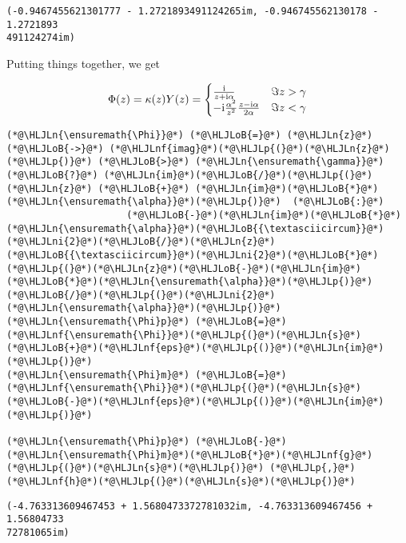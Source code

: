 \documentclass[12pt,a4paper]{article}
\newcommand{\HLJLn}[1]{#1}
\newcommand{\HLJLnf}[1]{\textcolor[RGB]{66,102,213}{#1}}
\newcommand{\HLJLni}[1]{\textcolor[RGB]{59,151,46}{#1}}
\newcommand{\HLJLoB}[1]{\textcolor[RGB]{102,102,102}{\textbf{#1}}}
\newcommand{\HLJLp}[1]{#1}
\def\I{ {\rm i} }
\begin{document}
\begin{lstlisting}
(-0.9467455621301777 - 1.2721893491124265im, -0.946745562130178 - 1.2721893
491124274im)
\end{lstlisting}


Putting things together, we get

\[
\Phi(z) = \kappa(z) Y(z) = \begin{cases} {\I \over z+\I \alpha }& \Im z > \gamma \\
                        -\I {\alpha^2 \over z^2} {z-\I \alpha \over 2 \alpha} & \Im z < \gamma
\end{cases}
\]

\begin{lstlisting}
(*@\HLJLn{\ensuremath{\Phi}}@*) (*@\HLJLoB{=}@*) (*@\HLJLn{z}@*) (*@\HLJLoB{->}@*) (*@\HLJLnf{imag}@*)(*@\HLJLp{(}@*)(*@\HLJLn{z}@*)(*@\HLJLp{)}@*) (*@\HLJLoB{>}@*) (*@\HLJLn{\ensuremath{\gamma}}@*) (*@\HLJLoB{?}@*) (*@\HLJLn{im}@*)(*@\HLJLoB{/}@*)(*@\HLJLp{(}@*)(*@\HLJLn{z}@*) (*@\HLJLoB{+}@*) (*@\HLJLn{im}@*)(*@\HLJLoB{*}@*)(*@\HLJLn{\ensuremath{\alpha}}@*)(*@\HLJLp{)}@*)  (*@\HLJLoB{:}@*)
                     (*@\HLJLoB{-}@*)(*@\HLJLn{im}@*)(*@\HLJLoB{*}@*)(*@\HLJLn{\ensuremath{\alpha}}@*)(*@\HLJLoB{{\textasciicircum}}@*)(*@\HLJLni{2}@*)(*@\HLJLoB{/}@*)(*@\HLJLn{z}@*)(*@\HLJLoB{{\textasciicircum}}@*)(*@\HLJLni{2}@*)(*@\HLJLoB{*}@*) (*@\HLJLp{(}@*)(*@\HLJLn{z}@*)(*@\HLJLoB{-}@*)(*@\HLJLn{im}@*)(*@\HLJLoB{*}@*)(*@\HLJLn{\ensuremath{\alpha}}@*)(*@\HLJLp{)}@*)(*@\HLJLoB{/}@*)(*@\HLJLp{(}@*)(*@\HLJLni{2}@*)(*@\HLJLn{\ensuremath{\alpha}}@*)(*@\HLJLp{)}@*)
(*@\HLJLn{\ensuremath{\Phi}p}@*) (*@\HLJLoB{=}@*) (*@\HLJLnf{\ensuremath{\Phi}}@*)(*@\HLJLp{(}@*)(*@\HLJLn{s}@*)(*@\HLJLoB{+}@*)(*@\HLJLnf{eps}@*)(*@\HLJLp{()}@*)(*@\HLJLn{im}@*)(*@\HLJLp{)}@*)
(*@\HLJLn{\ensuremath{\Phi}m}@*) (*@\HLJLoB{=}@*) (*@\HLJLnf{\ensuremath{\Phi}}@*)(*@\HLJLp{(}@*)(*@\HLJLn{s}@*)(*@\HLJLoB{-}@*)(*@\HLJLnf{eps}@*)(*@\HLJLp{()}@*)(*@\HLJLn{im}@*)(*@\HLJLp{)}@*)

(*@\HLJLn{\ensuremath{\Phi}p}@*) (*@\HLJLoB{-}@*) (*@\HLJLn{\ensuremath{\Phi}m}@*)(*@\HLJLoB{*}@*)(*@\HLJLnf{g}@*)(*@\HLJLp{(}@*)(*@\HLJLn{s}@*)(*@\HLJLp{)}@*) (*@\HLJLp{,}@*) (*@\HLJLnf{h}@*)(*@\HLJLp{(}@*)(*@\HLJLn{s}@*)(*@\HLJLp{)}@*)
\end{lstlisting}

\begin{lstlisting}
(-4.763313609467453 + 1.5680473372781032im, -4.763313609467456 + 1.56804733
72781065im)
\end{lstlisting}
\end{document}
